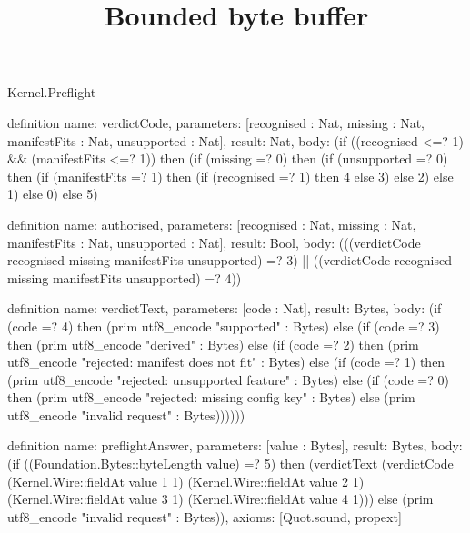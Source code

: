 \begin{lexlean}{Kernel.Preflight}
\title{Bounded byte buffer}
\begin{semanticmodule}
definition{
  name: verdictCode,
  parameters: [recognised : Nat, missing : Nat, manifestFits : Nat, unsupported : Nat],
  result: Nat,
  body: (if ((recognised <=? 1) && (manifestFits <=? 1)) then (if (missing =? 0) then (if (unsupported =? 0) then (if (manifestFits =? 1) then (if (recognised =? 1) then 4 else 3) else 2) else 1) else 0) else 5)
}

definition{
  name: authorised,
  parameters: [recognised : Nat, missing : Nat, manifestFits : Nat, unsupported : Nat],
  result: Bool,
  body: (((verdictCode recognised missing manifestFits unsupported) =? 3) || ((verdictCode recognised missing manifestFits unsupported) =? 4))
}

definition{
  name: verdictText,
  parameters: [code : Nat],
  result: Bytes,
  body: (if (code =? 4) then (prim utf8_encode "supported" : Bytes) else (if (code =? 3) then (prim utf8_encode "derived" : Bytes) else (if (code =? 2) then (prim utf8_encode "rejected: manifest does not fit" : Bytes) else (if (code =? 1) then (prim utf8_encode "rejected: unsupported feature" : Bytes) else (if (code =? 0) then (prim utf8_encode "rejected: missing config key" : Bytes) else (prim utf8_encode "invalid request" : Bytes))))))
}

definition{
  name: preflightAnswer,
  parameters: [value : Bytes],
  result: Bytes,
  body: (if ((Foundation.Bytes::byteLength value) =? 5) then (verdictText (verdictCode (Kernel.Wire::fieldAt value 1 1) (Kernel.Wire::fieldAt value 2 1) (Kernel.Wire::fieldAt value 3 1) (Kernel.Wire::fieldAt value 4 1))) else (prim utf8_encode "invalid request" : Bytes)),
  axioms: [Quot.sound, propext]
}
\end{semanticmodule}
\end{lexlean}
